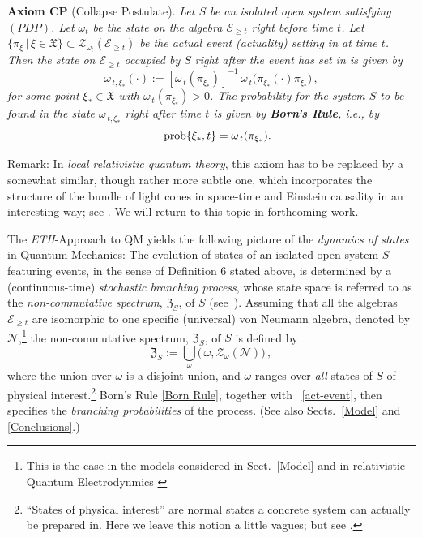 \documentclass[12pt]{article}
\begin{document}
{\bf{Axiom CP}} (Collapse Postulate).\label{collapseaxiom} \textit{Let $S$ be an isolated open system satisfying $(PDP)$. Let
$\omega_t$ be the state on the algebra $\mathcal{E}_{\geq t}$ right \textit{before} time $t$. Let
$\big\{ \pi_{\xi} \,|\, \xi \in \mathfrak{X} \big\} \subset \mathcal{Z}_{\omega_t}(\mathcal{E}_{\geq t})$ be the actual event (actuality) setting in at time $t$. Then the state on $\mathcal{E}_{\geq t}$ occupied by $S$ right \textit{after} the event has set in is given by
$$
\omega_{\,t, \xi_{*}}(\cdot):=[\omega_{\,t}(\pi_{\xi_{*}})]^{-1}\,\omega_{\,t}\big(\pi_{\xi_{*}} (\cdot) \pi_{\xi_{*}}\big) \,,
$$
for some point $\xi_{*} \in \mathfrak{X}$ with $\omega_{\,t}(\pi_{\xi_{*}})>0$. The probability for the system $S$ to be found in the state $\omega_{\,t,\xi_{*}}$ right \textit{after} time $t$ is given by {\bf{Born's Rule}}, i.e., by}
\begin{equation}\label{Born Rule}
\hspace{4.9cm}\text{\rm{prob}}\{\xi_{*}, t\} = \omega_{\,t}(\pi_{\xi_{*}}). \hspace{4.5cm} \square
\vspace{0.2cm}
\end{equation}

{Remark}: In \textit{local relativistic quantum theory}, this axiom has to be replaced by a somewhat similar, though
rather more subtle one, which incorporates the structure of the bundle of light cones in space-time and Einstein causality in an
interesting way; see \cite{Fr2}. We will return to this topic in forthcoming work.

The \textit{ETH}-Approach to QM yields the following picture of the \textit{dynamics of states} in Quantum Mechanics:
The evolution of states of an isolated open system $S$ featuring events, in the sense of Definition 6 stated above,
is determined by a (continuous-time) \textit{stochastic branching process}, whose state space is referred to
as the {\em{non-commutative spectrum}}, $\mathfrak{Z}_{S}$, of $S$ (see~\cite{Fr1}). Assuming that all the algebras
$\mathcal{E}_{\geq t}$ are isomorphic to one specific (universal) von Neumann algebra, denoted by $\mathcal{N}$,\footnote{This is the case in the models considered in Sect.~\ref{Model} and in relativistic Quantum Electrodynmics  \cite{Buchholz}} the non-commutative spectrum, $\mathfrak{Z}_{S}$, of $S$ is defined by
\begin{equation}\label{NCspect}
\mathfrak{Z}_{S}:= \bigcup_{\omega} \Big(\,\omega, \mathcal{Z}_{\omega}(\mathcal{N})\Big)\,,
\end{equation}
where the union over $\omega$ is a disjoint union, and $\omega$ ranges over \textit{all} states of $S$ of physical interest.\footnote{``States of physical interest'' are normal states a concrete system can actually be prepared in. Here we leave this notion a little vagues; but see \cite{Haag, Fr-Schub}.}
Born's Rule \eqref{Born Rule}, together with ~\eqref{act-event}, then specifies the \textit{branching probabilities}
of the process. (See also Sects.~\ref{Model} and \ref{Conclusions}.)\\
\end{document}
